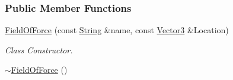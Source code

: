 \subsubsection*{Public Member Functions}
\begin{DoxyCompactItemize}
\item 
\hyperlink{classphys_1_1FieldOfForce_a0e9496af8a6c8cb0d79ebe40bbe223f2}{FieldOfForce} (const \hyperlink{namespacephys_aa03900411993de7fbfec4789bc1d392e}{String} \&name, const \hyperlink{classphys_1_1Vector3}{Vector3} \&Location)
\begin{DoxyCompactList}\small\item\em Class Constructor. \item\end{DoxyCompactList}\item 
\hypertarget{classphys_1_1FieldOfForce_a263efed38a423130a2b3271db6fcbb88}{
\hyperlink{classphys_1_1FieldOfForce_a263efed38a423130a2b3271db6fcbb88}{$\sim$FieldOfForce} ()}
\label{classphys_1_1FieldOfForce_a263efed38a423130a2b3271db6fcbb88}


\end{DoxyCompactItemize}
